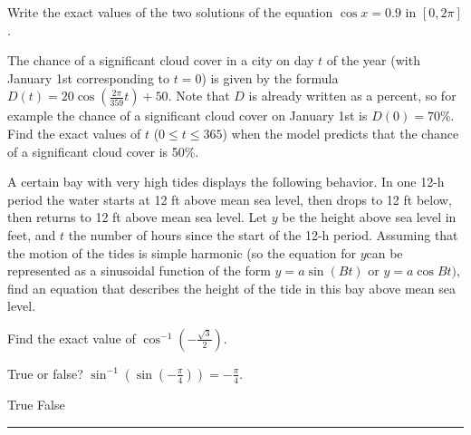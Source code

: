 \documentclass[11pt,answers]{exam}
\begin{document}
\begin{questions}


\addpoints


 \question[2] Write the exact values of the two solutions of the equation $\displaystyle \cos x = 0.9$ in $[0,2\pi ]$.
  
 	
 	\fillwithdottedlines{1.1in}
 	\bigskip
 
\question[2] The chance of a significant cloud cover in a city on day $t$ of the year (with January 1st corresponding to $t=0$) is given by the formula $\displaystyle D(t)=20\cos \left ( \frac{2\pi }{359}t\right )+50$. Note that $D$ is already written as a percent, so for example the chance of a significant cloud cover on January 1st is $D(0)=70\%$. Find the exact values of $t$ ($0\leq t \leq 365$) when the model predicts that the chance of a significant cloud cover is 50\%. 

 	\fillwithdottedlines{1.3in}
 	\bigskip
 \question[2] A certain bay with very high tides displays the following behavior. In one 12-h period the water starts at 12 ft above mean sea level, then drops to 12 ft below, then returns to 12 ft above mean sea level. Let $y$ be the height above sea level in feet, and $t$ the number of hours since the start of the 12-h period.	 Assuming that the motion of the tides is simple harmonic (so the equation for $y$can be represented as a sinusoidal function of the form $y=a\sin(Bt)$ or $y=a\cos Bt)$, find an equation that describes the height of the tide in this bay above mean sea level. 
 
  	\fillwithdottedlines{1.3in}
  	\bigskip
  	
  	\question[1] Find the exact value of $\displaystyle \cos^{-1}\left ( -\frac{\sqrt{3}}{2} \right )$. \dotfill
  	\bigskip
  	
 \bonusquestion[1] True or false?
$\displaystyle  \sin^{-1}\left ( \sin \left ( -\frac{\pi}{4}\right ) \right ) = -\frac{\pi}{4}$.
 \begin{oneparchoices}
 	\choice True \choice False
 	\end{oneparchoices}
\end{questions}
\newpage

\par\medskip\hrule\medskip
\end{document}
